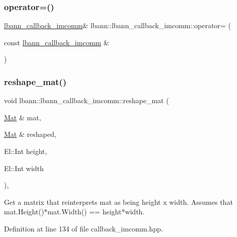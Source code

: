\subsubsection{\texorpdfstring{operator=()}{operator=()}}
{\footnotesize\ttfamily \hyperlink{classlbann_1_1lbann__callback__imcomm}{lbann\+\_\+callback\+\_\+imcomm}\& lbann\+::lbann\+\_\+callback\+\_\+imcomm\+::operator= (\begin{DoxyParamCaption}\item[{const \hyperlink{classlbann_1_1lbann__callback__imcomm}{lbann\+\_\+callback\+\_\+imcomm} \&}]{ }\end{DoxyParamCaption})\hspace{0.3cm}{\ttfamily [default]}}

\mbox{\label{classlbann_1_1lbann__callback__imcomm_a13fe710b841f72e28daf8de029f6c2f9}} 
\subsubsection{\texorpdfstring{reshape\+\_\+mat()}{reshape\_mat()}}
{\footnotesize\ttfamily void lbann\+::lbann\+\_\+callback\+\_\+imcomm\+::reshape\+\_\+mat (\begin{DoxyParamCaption}\item[{\hyperlink{base_8hpp_a68f11fdc31b62516cb310831bbe54d73}{Mat} \&}]{mat,  }\item[{\hyperlink{base_8hpp_a68f11fdc31b62516cb310831bbe54d73}{Mat} \&}]{reshaped,  }\item[{El\+::\+Int}]{height,  }\item[{El\+::\+Int}]{width }\end{DoxyParamCaption})\hspace{0.3cm}{\ttfamily [inline]}, {\ttfamily [private]}}

Get a matrix that reinterprets mat as being height x width. Assumes that mat.\+Height()$\ast$mat.Width() == height$\ast$width. 

Definition at line 134 of file callback\+\_\+imcomm.\+hpp.


